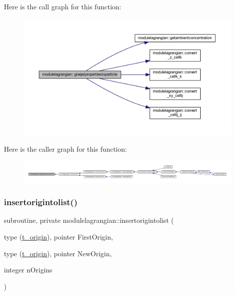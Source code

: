 Here is the call graph for this function\+:\nopagebreak
\begin{figure}[H]
\begin{center}
\leavevmode
\includegraphics[width=350pt]{namespacemodulelagrangian_a71c61c30f1e91a2e99d88358b92559eb_cgraph}
\end{center}
\end{figure}
Here is the caller graph for this function\+:\nopagebreak
\begin{figure}[H]
\begin{center}
\leavevmode
\includegraphics[width=350pt]{namespacemodulelagrangian_a71c61c30f1e91a2e99d88358b92559eb_icgraph}
\end{center}
\end{figure}
\mbox{\label{namespacemodulelagrangian_a842c38bc1af98cfe321b3cd2eca5aa14}} 
\subsubsection{\texorpdfstring{insertorigintolist()}{insertorigintolist()}}
{\footnotesize\ttfamily subroutine, private modulelagrangian\+::insertorigintolist (\begin{DoxyParamCaption}\item[{type (\mbox{\hyperlink{structmodulelagrangian_1_1t__origin}{t\+\_\+origin}}), pointer}]{First\+Origin,  }\item[{type (\mbox{\hyperlink{structmodulelagrangian_1_1t__origin}{t\+\_\+origin}}), pointer}]{New\+Origin,  }\item[{integer}]{n\+Origins }\end{DoxyParamCaption})\hspace{0.3cm}{\ttfamily [private]}}

